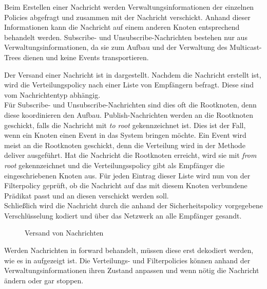 Beim Erstellen einer Nachricht werden Verwaltungsinformationen der einzelnen Policies abgefragt und zusammen mit der Nachricht verschickt. Anhand dieser Informationen kann die Nachricht auf einem anderen Knoten entsprechend behandelt werden. Subscribe- und Unsubscribe-Nachrichten bestehen nur aus Verwaltungsinformationen, da sie zum Aufbau und der Verwaltung des Multicast-Trees dienen und keine Events transportieren.

Der Versand einer Nachricht ist in  dargestellt. Nachdem die Nachricht erstellt ist, wird die Verteilungspolicy nach einer Liste von Empfängern befragt. Diese sind vom Nachrichtentyp abhängig.\\
Für Subscribe- und Unsubscribe-Nachrichten sind dies oft die Rootknoten, denn diese koordinieren den Aufbau. Publish-Nachrichten werden an die Rootknoten geschickt, falls die Nachricht mit \emph{to root} gekennzeichnet ist. Dies ist der Fall, wenn ein Knoten einen Event in das System bringen möchte. Ein Event wird meist an die Rootknoten geschickt, denn die Verteilung wird in der Methode deliver ausgeführt. Hat die Nachricht die Rootknoten erreicht, wird sie mit \emph{from root} gekennzeichnet und die Verteilungsspolicy gibt als Empfänger die eingeschriebenen Knoten aus. Für jeden Eintrag dieser Liste wird nun von der Filterpolicy geprüft, ob die Nachricht auf das mit diesem Knoten verbundene Prädikat passt und an diesen verschickt werden soll.\\
Schließlich wird die Nachricht durch die anhand der Sicherheitspolicy vorgegebene Verschlüsselung kodiert und über das Netzwerk an alle Empfänger gesandt.

\begin{figure}[htbp]
\centering
{}
\caption{Versand von Nachrichten}
\label{fig:processing_send}
\end{figure}

Werden Nachrichten in forward behandelt, müssen diese erst dekodiert werden, wie es in  aufgezeigt ist. Die Verteilungs- und Filterpolicies können anhand der Verwaltungsinformationen ihren Zustand anpassen und wenn nötig die Nachricht ändern oder gar stoppen.

